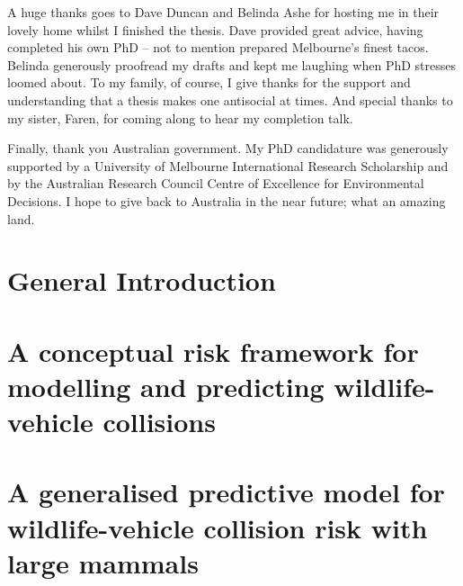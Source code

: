\documentclass[titlesmallcaps,copyrightpage,examinerscopy]{uomthesis}
\begin{document}
A huge thanks goes to Dave Duncan and Belinda Ashe for hosting me in their lovely home whilst I finished the thesis. Dave provided great advice, having completed his own PhD -- not to mention prepared Melbourne's finest tacos. Belinda generously proofread my drafts and kept me laughing when PhD stresses loomed about. To my family, of course, I give thanks for the support and understanding that a thesis makes one antisocial at times. And special thanks to my sister, Faren, for coming along to hear my completion talk.

Finally, thank you Australian government. My PhD candidature was generously supported by a University of Melbourne International Research Scholarship and by the Australian Research Council Centre of Excellence for Environmental Decisions. I hope to give back to Australia in the near future; what an amazing land.
\clearpage{\pagestyle{empty}\cleardoublepage}

\tableofcontents
\clearpage{\pagestyle{empty}\cleardoublepage}

\listoffigures
\clearpage{\pagestyle{empty}\cleardoublepage}

\listoftables
\clearpage{\pagestyle{empty}\cleardoublepage}

\mainmatter

%
\chapter{General Introduction}\label{sec:intro}
\clearpage{\pagestyle{empty}\cleardoublepage}

%
\chapter{A conceptual risk framework for modelling and predicting wildlife-vehicle collisions}\label{sec:egk}
\clearpage{\pagestyle{empty}\cleardoublepage}


\clearpage{\pagestyle{empty}\cleardoublepage}

%
\chapter{A generalised predictive model for wildlife-vehicle collision risk with large mammals}\label{sec:cal}
\clearpage{\pagestyle{empty}\cleardoublepage}
\end{document}
